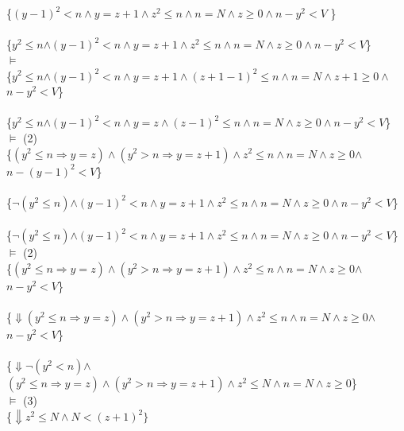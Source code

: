 \documentclass{article}
\begin{document}
\\
 \\
\{$(y-1)^2<n \land y = z+1\land z^2 \leq n \land n=N \land z\geq 0\land$\colorbox{teal!10}{$n-y^2<V$} \}
\\
 \\
\{\colorbox{NavyBlue!10}{$y^2 \leq n$}$\land (y-1)^2<n \land y = z+1\land z^2 \leq n \land n=N \land z\geq 0\land$\colorbox{teal!10}{$n-y^2<V$}\} \\
$\vDash$ \\
\{\colorbox{NavyBlue!10}{$y^2 \leq n$}$\land (y-1)^2<n \land y = z+1\land (z+1-1)^2 \leq n \land n=N \land z+1 \geq 0\land$\colorbox{teal!10}{$n-y^2<V$}\}
\\
 \\
\{\colorbox{NavyBlue!10}{$y^2 \leq n$}$\land (y-1)^2<n \land y = z\land (z-1)^2 \leq n \land n=N \land z \geq 0\land$\colorbox{teal!10}{$n-y^2<V$}\}\\
$\vDash$ (2) \\
\{\colorbox{blue!10}{$(y^2 \leq n \Rightarrow y = z) \land (y^2 > n \Rightarrow y = z + 1) \land z^2 \leq n \land n=N \land z \geq 0$}$\land$\colorbox{teal!10}{$n-(y-1)^2<V$}\} 
\\
 \\
\{\colorbox{NavyBlue!10}{$\lnot(y^2 \leq n)$}$\land (y-1)^2<n \land y = z+ 1 \land z^2 \leq n \land n=N \land z \geq 0\land$\colorbox{teal!10}{$n-y^2<V$}\}
\\
 \\
\{\colorbox{NavyBlue!10}{$\lnot(y^2 \leq n)$}$\land (y-1)^2<n \land y = z+ 1 \land z^2 \leq n \land n=N \land z \geq 0\land$\colorbox{teal!10}{$n-y^2<V$}\}\\
$\vDash$ (2) \\
\{\colorbox{blue!10}{$(y^2 \leq n \Rightarrow y = z) \land (y^2 > n \Rightarrow y = z + 1) \land z^2 \leq n \land n=N \land z \geq 0$}$\land$\colorbox{teal!10}{$n-y^2<V$}\} 
\\
 \\
\{$\Downarrow$\colorbox{blue!10}{$(y^2 \leq n \Rightarrow y = z) \land (y^2 > n \Rightarrow y = z + 1) \land z^2 \leq n \land n=N \land z \geq 0$}$\land$\colorbox{teal!10}{$n-y^2<V$}\}
\\
 \\
\{$\Downarrow$\colorbox{magenta!10}{$\lnot (y^2 < n)$}$\land$\colorbox{blue!10}{$(y^2 \leq n \Rightarrow y = z) \land (y^2 > n \Rightarrow y = z + 1) \land z^2 \leq N \land n=N \land z \geq 0$}\} \\
$\vDash$ (3) \\
\{$\Downarrow z^2 \leq N \land N < (z+1)^2\}$
\end{document}
